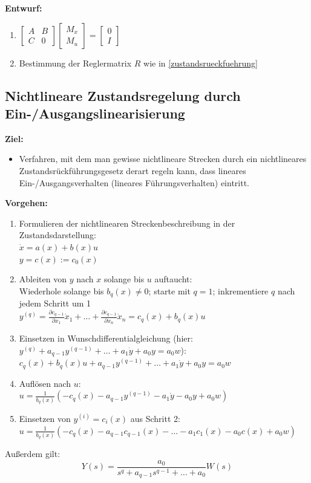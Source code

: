 \documentclass[10pt,a4paper]{article}
\newcommand{\vect}[1]{\ensuremath{\begin{bmatrix}#1\end{bmatrix}}}
\begin{document}
\textbf{Entwurf:}
\begin{enumerate}
	\item $
	\vect{A & B \\ C & 0} \vect{M_x \\ M_u} = \vect{0 \\ I}
	$
	\item Bestimmung der Reglermatrix $R$ wie in \ref{zustandsrueckfuehrung}
\end{enumerate}

\subsection{Nichtlineare Zustandsregelung durch Ein-/Ausgangslinearisierung}
\textbf{Ziel:}
\begin{itemize}
	\item Verfahren, mit dem man gewisse nichtlineare Strecken durch ein nichtlineares Zustandsrückführungsgesetz derart regeln kann, dass lineares Ein-/Ausgangsverhalten (lineares Führungsverhalten) eintritt.
\end{itemize}

\textbf{Vorgehen:}
\begin{enumerate}
	\item Formulieren der nichtlinearen Streckenbeschreibung in der Zustandsdarstellung: \\
	$\dot x = a(x) + b(x) u$ \\
	$y = c(x) := c_0(x)$
	\item Ableiten von $y$ nach $x$ solange bis $u$ auftaucht: \\
	Wiederhole solange bis $b_q(x) ≠ 0$; starte mit $q = 1$; inkrementiere $q$ nach jedem Schritt um 1\\
	$y^{(q)} = \frac{\partial c_{q-1}}{\partial x_1} \dot x_1 + \dots + \frac{\partial c_{q-1}}{\partial x_n} \dot x_n = c_q(x) + b_q(x) u$
	\item Einsetzen in Wunschdifferentialgleichung (hier: $y^{(q)} + a_{q - 1}y^{(q-1)} + \dots + a_1 \dot y + a_0y = a_0 w$): \\
	$c_q(x) + b_q(x) u + a_{q-1} y^{(q-1)} + \dots + a_1 \dot y + a_0 y = a_0 w$
	\item Auflösen nach $u$: \\
	$u = \frac 1 {b_q(x)} (-c_q(x) - a_{q-1} y^{(q-1)} - a_1 \dot y - a_0 y + a_0 w)$
	\item Einsetzen von $y^{(i)} = c_i(x)$ aus Schritt 2: \\
	$u = \frac 1 {b_q(x)} (-c_q(x) - a_{q-1} c_{q-1}(x) - \dots - a_1 c_1(x) - a_0 c(x) + a_0 w)$
\end{enumerate}
Außerdem gilt:
$$
	Y(s) = \frac{a_0}{s^q + a_{q-1}s^{q-1} + \dots + a_0} W(s)
$$
\end{document}
